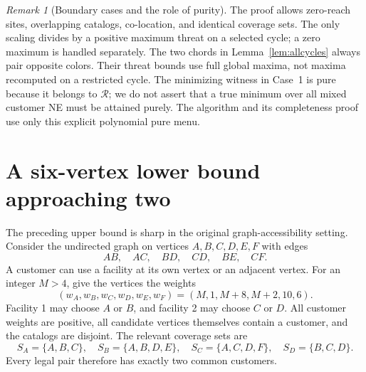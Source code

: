 \documentclass[11pt]{article}
\theoremstyle{definition}
\theoremstyle{remark}
\newtheorem{remark}[theorem]{Remark}
\newcommand{\Rmenu}{\mathcal R}
\begin{document}
\begin{remark}[Boundary cases and the role of purity]
The proof allows zero-reach sites, overlapping catalogs, co-location, and identical coverage sets. The only scaling divides by a positive maximum threat on a selected cycle; a zero maximum is handled separately. The two chords in Lemma~\ref{lem:allcycles} always pair opposite colors. Their threat bounds use full global maxima, not maxima recomputed on a restricted cycle. The minimizing witness in Case~1 is pure because it belongs to $\Rmenu$; we do not assert that a true minimum over all mixed customer NE must be attained purely. The algorithm and its completeness proof use only this explicit polynomial pure menu.
\end{remark}

\section{A six-vertex lower bound approaching two}\label{sec:sharp-two}

The preceding upper bound is sharp in the original graph-accessibility setting. Consider the undirected graph on vertices $A,B,C,D,E,F$ with edges
\[
 AB,\quad AC,\quad BD,\quad CD,\quad BE,\quad CF.
\]
A customer can use a facility at its own vertex or an adjacent vertex. For an integer $M>4$, give the vertices the weights
\[
 (w_A,w_B,w_C,w_D,w_E,w_F)=(M,1,M+8,M+2,10,6).
\]
Facility 1 may choose $A$ or $B$, and facility 2 may choose $C$ or $D$. All customer weights are positive, all candidate vertices themselves contain a customer, and the catalogs are disjoint. The relevant coverage sets are
\[
 S_A=\{A,B,C\},\quad S_B=\{A,B,D,E\},\quad
 S_C=\{A,C,D,F\},\quad S_D=\{B,C,D\}.
\]
Every legal pair therefore has exactly two common customers.
\end{document}
